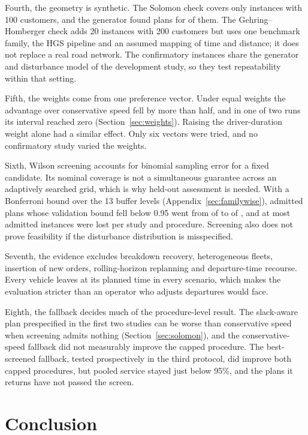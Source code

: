 \documentclass[11pt,a4paper]{article}
\begin{document}
Fourth, the geometry is synthetic. The Solomon check covers only \SolomonN{}
instances with 100 customers, and the generator found plans for \SolomonPlans{}
of them. The Gehring--Homberger check adds 20 instances with 200 customers but
uses one benchmark family, the HGS pipeline and an assumed mapping of time and
distance; it does not replace a real road network. The confirmatory instances
share the generator and disturbance model of the development study, so they test
repeatability within that setting.

Fifth, the weights come from one preference vector. Under equal weights the
advantage over conservative speed fell by more than half, and in one of two runs
its interval reached zero (Section~\ref{sec:weights}). Raising the
driver-duration weight alone had a similar effect. Only six vectors were tried,
and no confirmatory study varied the weights.

Sixth, Wilson screening accounts for binomial sampling error for a fixed
candidate. Its nominal coverage is not a simultaneous guarantee across an
adaptively searched grid, which is why held-out assessment is needed. With a
Bonferroni bound over the 13 buffer levels (Appendix~\ref{sec:familywise}),
admitted plans whose validation bound fell below 0.95 went from \FwMissOrig{} of
\FwAdmittedOrig{} to \FwMissFw{} of \FwAdmittedTotal{}, and at most
\FwLostMax{} admitted instances were lost per study and procedure. Screening also
does not prove feasibility if the disturbance distribution is misspecified.

Seventh, the evidence excludes breakdown recovery, heterogeneous fleets, insertion
of new orders, rolling-horizon replanning and departure-time recourse. Every
vehicle leaves at its planned time in every scenario, which makes the evaluation
stricter than an operator who adjusts departures would face.

Eighth, the fallback decides much of the procedure-level result. The
slack-aware plan prespecified in the first two studies can be worse than
conservative speed when screening admits nothing (Section~\ref{sec:solomon}),
and the conservative-speed fallback did not measurably improve the capped
procedure. The best-screened fallback, tested prospectively in the third
protocol, did improve both capped procedures, but pooled service stayed just
below 95\%, and the plans it returns have not passed the screen.

\section{Conclusion}
\end{document}
